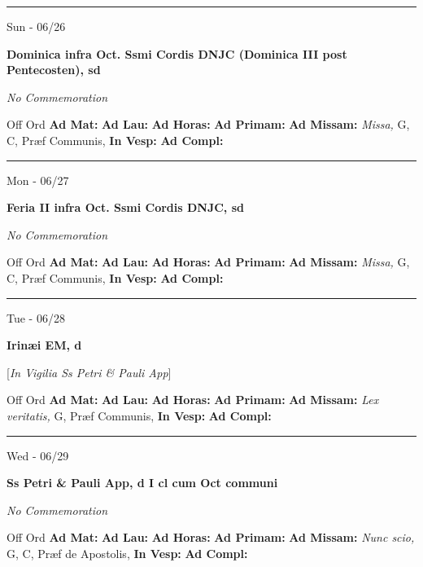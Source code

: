 \documentclass[letterpaper, 10pt]{article}
\begin{document}
\hrule
\begin{center}
Sun - 06/26
\end{center}\textbf{ \large Dominica infra Oct. Ssmi Cordis DNJC (Dominica III post Pentecosten), \textnormal{\normalsize sd}}

\textit{No Commemoration}\begin{justify}
Off Ord
\textbf{Ad Mat: }
\textbf{Ad Lau: }
\textbf{Ad Horas: }
\textbf{Ad Primam: }
\textbf{Ad Missam:} \textit{Missa, } G, C, Præf Communis, 
\textbf{In Vesp: }
\textbf{Ad Compl: }\end{justify}



\hrule
\begin{center}
Mon - 06/27
\end{center}\textbf{ \large Feria II infra Oct. Ssmi Cordis DNJC, \textnormal{\normalsize sd}}

\textit{No Commemoration}\begin{justify}
Off Ord
\textbf{Ad Mat: }
\textbf{Ad Lau: }
\textbf{Ad Horas: }
\textbf{Ad Primam: }
\textbf{Ad Missam:} \textit{Missa, } G, C, Præf Communis, 
\textbf{In Vesp: }
\textbf{Ad Compl: }\end{justify}



\hrule
\begin{center}
Tue - 06/28
\end{center}\textbf{ \large Irinæi EM, \textnormal{\normalsize d}}

[\textit{In Vigilia Ss Petri \& Pauli App}]
\begin{justify}
Off Ord
\textbf{Ad Mat: }
\textbf{Ad Lau: }
\textbf{Ad Horas: }
\textbf{Ad Primam: }
\textbf{Ad Missam:} \textit{Lex veritatis, } G, Præf Communis, 
\textbf{In Vesp: }
\textbf{Ad Compl: }\end{justify}



\hrule
\begin{center}
Wed - 06/29
\end{center}\textbf{ \large Ss Petri \& Pauli App, \textnormal{\normalsize d I cl cum Oct communi}}

\textit{No Commemoration}\begin{justify}
Off Ord
\textbf{Ad Mat: }
\textbf{Ad Lau: }
\textbf{Ad Horas: }
\textbf{Ad Primam: }
\textbf{Ad Missam:} \textit{Nunc scio, } G, C, Præf de Apostolis, 
\textbf{In Vesp: }
\textbf{Ad Compl: }\end{justify}
\end{document}
